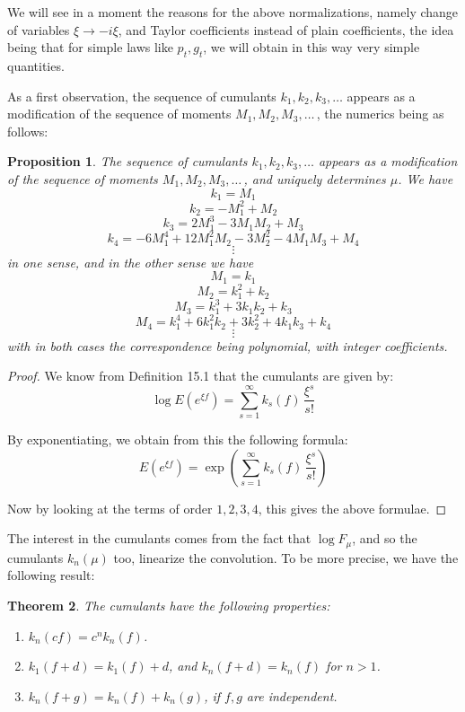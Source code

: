 \documentclass[12pt]{amsbook}
\newtheorem{theorem}{Theorem}[chapter]
\newtheorem{proposition}[theorem]{Proposition}
\begin{document}
We will see in a moment the reasons for the above normalizations, namely change of variables $\xi\to -i\xi$, and Taylor coefficients instead of plain coefficients, the idea being that for simple laws like $p_t,g_t$, we will obtain in this way very simple quantities.

\bigskip

As a first observation, the sequence of cumulants $k_1,k_2,k_3,\ldots$ appears as a modification of the sequence of moments $M_1,M_2,M_3,\ldots\,$, the numerics being as follows:


\begin{proposition}
The sequence of cumulants $k_1,k_2,k_3,\ldots$ appears as a modification of the sequence of moments $M_1,M_2,M_3,\ldots\,$, and uniquely determines $\mu$. We have
$$k_1=M_1$$
$$k_2=-M_1^2+M_2$$
$$k_3=2M_1^3-3M_1M_2+M_3$$
$$k_4=-6M_1^4+12M_1^2M_2-3M_2^2-4M_1M_3+M_4$$
$$\vdots$$
in one sense, and in the other sense we have
$$M_1=k_1$$
$$M_2=k_1^2+k_2$$
$$M_3=k_1^3+3k_1k_2+k_3$$
$$M_4=k_1^4+6k_1^2k_2+3k_2^2+4k_1k_3+k_4$$
$$\vdots$$
with in both cases the correspondence being polynomial, with integer coefficients.
\end{proposition}

\begin{proof}
We know from Definition 15.1 that the cumulants are given by:
$$\log E(e^{\xi f})=\sum_{s=1}^\infty k_s(f)\,\frac{\xi^s}{s!}$$

By exponentiating, we obtain from this the following formula:
$$E(e^{\xi f})=\exp\left(\sum_{s=1}^\infty k_s(f)\,\frac{\xi^s}{s!}\right)$$

Now by looking at the terms of order $1,2,3,4$, this gives the above formulae.
\end{proof}

The interest in the cumulants comes from the fact that $\log F_\mu$, and so the cumulants $k_n(\mu)$ too, linearize the convolution. To be more precise, we have the following result:


\begin{theorem}
The cumulants have the following properties:
\begin{enumerate}
\item $k_n(cf)=c^nk_n(f)$.

\item $k_1(f+d)=k_1(f)+d$, and $k_n(f+d)=k_n(f)$ for $n>1$.

\item $k_n(f+g)=k_n(f)+k_n(g)$, if $f,g$ are independent.
\end{enumerate}
\end{theorem}
\end{document}
